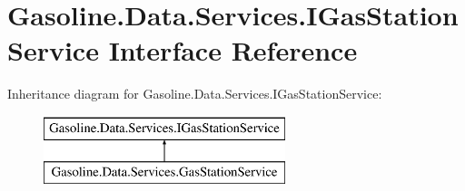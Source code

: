 \hypertarget{interface_gasoline_1_1_data_1_1_services_1_1_i_gas_station_service}{}\section{Gasoline.\+Data.\+Services.\+I\+Gas\+Station\+Service Interface Reference}
\label{interface_gasoline_1_1_data_1_1_services_1_1_i_gas_station_service}
Inheritance diagram for Gasoline.\+Data.\+Services.\+I\+Gas\+Station\+Service\+:\begin{figure}[H]
\begin{center}
\leavevmode
\includegraphics[height=2.000000cm]{interface_gasoline_1_1_data_1_1_services_1_1_i_gas_station_service}
\end{center}
\end{figure}
